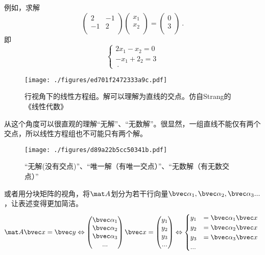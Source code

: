 \begin{example}{}
例如，求解
$$
\begin{pmatrix}
2&-1\\
-1&2\\
\end{pmatrix}
\begin{pmatrix}
x_1\\
x_2\\
\end{pmatrix}
=
\begin{pmatrix}
0\\
3\\
\end{pmatrix}~.
$$
即
$$
\begin{cases}
2x_1-x_2=0\\
-x_1+2_2=3\\~.
\end{cases}
$$
\begin{figure}[ht]
\centering
\texttt{[image: ./figures/ed701f2472333a9c.pdf]}
\caption{行视角下的线性方程组。解可以理解为直线的交点。仿自Strang的《线性代数》} \label{fig_LinEq_2}
\end{figure}
\end{example}
从这个角度可以很直观的理解“无解”、“无数解”。很显然，一组直线不能仅有两个交点，所以线性方程组也不可能只有两个解。
\begin{figure}[ht]
\centering
\texttt{[image: ./figures/d89a22b5cc50341b.pdf]}
\caption{“无解(没有交点)”、“唯一解（有唯一交点）”、“无数解（有无数交点）”} \label{fig_LinEq_3}
\end{figure}

或者用分块矩阵的视角，将$\mat A$划分为若干行向量$\bvec \alpha_1, \bvec \alpha_2,\bvec \alpha_3...$，让表述变得更加简洁。
$$
\mat A \bvec x=\bvec y \Leftrightarrow 
\begin{pmatrix}
\bvec \alpha_1\\
\bvec \alpha_2\\
\bvec \alpha_3\\
...
\end{pmatrix}
\bvec x
=
\begin{pmatrix}
y_{1}\\
y_{2}\\
y_{3}\\
...\\
\end{pmatrix}
\Leftrightarrow 
\begin{cases}
y_1&=\bvec \alpha_1 \bvec x\\
y_2&=\bvec \alpha_2 \bvec x\\
y_3&=\bvec \alpha_3 \bvec x\\
...&\\
\end{cases}~
$$

